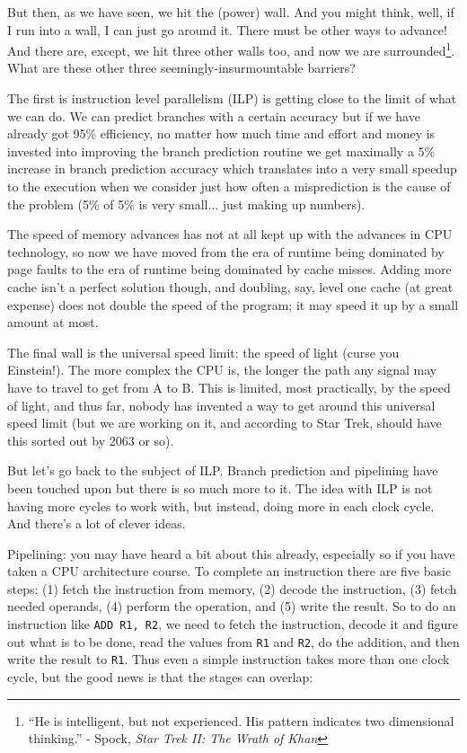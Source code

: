 But then, as we have seen, we hit the (power) wall. And you might think, well, if I run into a wall, I can just go around it. There must be other ways to advance! And there are, except, we hit three other walls too, and now we are surrounded\footnote{``He is intelligent, but not experienced. His pattern indicates two dimensional thinking.'' - Spock, \textit{Star Trek II: The Wrath of Khan}}. What are these other three seemingly-insurmountable barriers?

The first is instruction level parallelism (ILP) is getting close to the limit of what we can do. We can predict branches with a certain accuracy but if we have already got 95\% efficiency, no matter how much time and effort and money is invested into improving the branch prediction routine we get maximally a 5\% increase in branch prediction accuracy which translates into a very small speedup to the execution when we consider just how often a misprediction is the cause of the problem (5\% of 5\% is very small... just making up numbers).

The speed of memory advances has not at all kept up with the advances in CPU technology, so now we have moved from the era of runtime being dominated by page faults to the era of runtime being dominated by cache misses. Adding more cache isn't a perfect solution though, and doubling, say, level one cache (at great expense) does not double the speed of the program; it may speed it up by a small amount at most. 

The final wall is the universal speed limit: the speed of light (curse you Einstein!). The more complex the CPU is, the longer the path any signal may have to travel to get from A to B. This is limited, most practically, by the speed of light, and thus far, nobody has invented a way to get around this universal speed limit (but we are working on it, and according to Star Trek, should have this sorted out by 2063 or so).

But let's go back to the subject of ILP. Branch prediction and pipelining have been touched upon but there is so much more to it. The idea with ILP is not having more cycles to work with, but instead, doing more in each clock cycle. And there's a lot of clever ideas. 

Pipelining: you may have heard a bit about this already, especially so if you have taken a CPU architecture course. To complete an instruction there are five basic steps: (1) fetch the instruction from memory, (2) decode the instruction, (3) fetch needed operands, (4) perform the operation, and (5) write the result. So to do an instruction like \texttt{ADD R1, R2}, we need to fetch the instruction, decode it and figure out what is to be done, read the values from \texttt{R1} and \texttt{R2}, do the addition, and then write the result to \texttt{R1}. Thus even a simple instruction takes more than one clock cycle, but the good news is that the stages can overlap:

